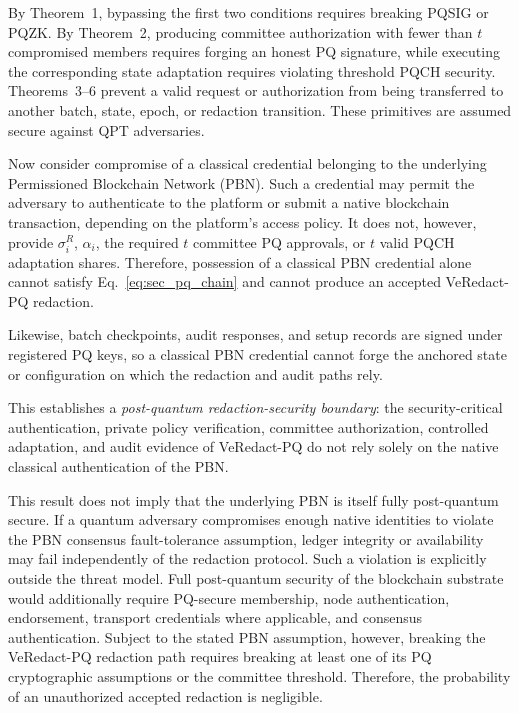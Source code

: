 \documentclass[lettersize,journal]{IEEEtran}
\begin{document}
    By Theorem~1, bypassing the first two conditions requires breaking
    PQSIG or PQZK. By Theorem~2, producing committee authorization with
    fewer than $t$ compromised members requires forging an honest PQ
    signature, while executing the corresponding state adaptation
    requires violating threshold PQCH security. Theorems~3--6 prevent a
    valid request or authorization from being transferred to another
    batch, state, epoch, or redaction transition. These primitives are
    assumed secure against QPT adversaries.
    
    Now consider compromise of a classical credential belonging to the
    underlying Permissioned Blockchain Network (PBN). Such a credential
    may permit the adversary to authenticate to the platform or submit a
    native blockchain transaction, depending on the platform's access
    policy. It does not, however, provide $\sigma_i^R$, $\alpha_i$, the
    required $t$ committee PQ approvals, or $t$ valid PQCH adaptation
    shares. Therefore, possession of a classical PBN credential alone
    cannot satisfy Eq.~\eqref{eq:sec_pq_chain} and cannot produce an
    accepted VeRedact-PQ redaction.
    
     {Likewise, batch checkpoints, audit responses, and setup
    records are signed under registered PQ keys, so a classical PBN
    credential cannot forge the anchored state or configuration on which
    the redaction and audit paths rely.}
    
    This establishes a \emph{post-quantum redaction-security boundary}:
    the security-critical authentication, private policy verification,
    committee authorization, controlled adaptation, and audit evidence
    of VeRedact-PQ do not rely solely on the native classical
    authentication of the PBN.
    
    This result does not imply that the underlying PBN is itself fully
    post-quantum secure. If a quantum adversary compromises enough native
    identities to violate the PBN consensus fault-tolerance assumption,
    ledger integrity or availability may fail independently of the
    redaction protocol. Such a violation is explicitly outside the threat
    model. Full post-quantum security of the blockchain substrate would
    additionally require PQ-secure membership, node authentication,
    endorsement, transport credentials where applicable, and consensus
    authentication. Subject to the stated PBN assumption, however,
    breaking the VeRedact-PQ redaction path requires breaking at least one
    of its PQ cryptographic assumptions or the committee threshold.
    Therefore, the probability of an unauthorized accepted redaction is
    negligible.
     
\end{document}
